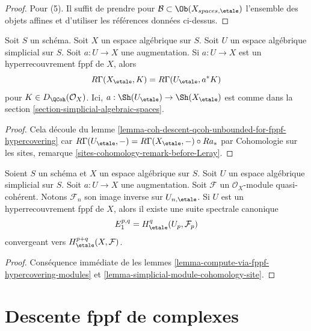 \begin{proof}
\medskip\noindent
Pour (5). Il suffit de prendre pour $\mathcal{B} \subset \Ob(X_{spaces, \etale})$
l'ensemble des objets affines et d'utiliser les références données ci-dessus.
\end{proof}

\begin{lemma}
\label{lemma-compute-via-fppf-hypercovering-modules}
Soit $S$ un schéma. Soit $X$ un espace algébrique sur $S$.
Soit $U$ un espace algébrique simplicial sur $S$. Soit $a : U \to X$
une augmentation. Si $a : U \to X$ est un hyperrecouvrement fppf de $X$, alors
$$
R\Gamma(X_\etale, K) = R\Gamma(U_\etale, a^*K)
$$
pour $K \in D_\QCoh(\mathcal{O}_X)$. Ici, $a : \Sh(U_\etale) \to \Sh(X_\etale)$
est comme dans la section \ref{section-simplicial-algebraic-spaces}.
\end{lemma}

\begin{proof}
Cela découle du lemme
\ref{lemma-coh-descent-qcoh-unbounded-for-fppf-hypercovering}
car $R\Gamma(U_\etale, -) = R\Gamma(X_\etale, -) \circ Ra_*$ par
Cohomologie sur les sites, remarque \ref{sites-cohomology-remark-before-Leray}.
\end{proof}

\begin{lemma}
\label{lemma-spectral-sequence-fppf-hypercovering-modules}
Soient $S$ un schéma et $X$ un espace algébrique sur $S$.
Soit $U$ un espace algébrique simplicial sur $S$. Soit $a : U \to X$
une augmentation. Soit $\mathcal{F}$ un
$\mathcal{O}_X$-module quasi-cohérent. Notons $\mathcal{F}_n$ son image inverse sur
$U_{n, \etale}$. Si $U$ est un hyperrecouvrement fppf de $X$, alors
il existe une suite spectrale canonique
$$
E_1^{p, q} = H^q_\etale(U_p, \mathcal{F}_p)
$$
convergeant vers $H^{p + q}_\etale(X, \mathcal{F})$.
\end{lemma}

\begin{proof}
Conséquence immédiate de
les lemmes \ref{lemma-compute-via-fppf-hypercovering-modules}
et \ref{lemma-simplicial-module-cohomology-site}.
\end{proof}







\section{Descente fppf de complexes}
\label{section-fppf-descent-derived}

